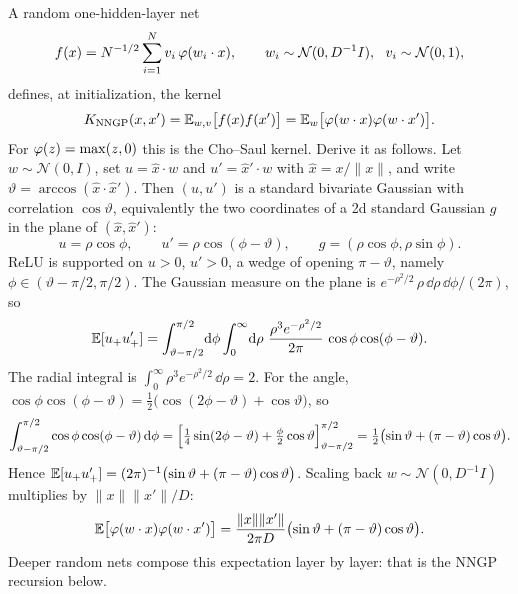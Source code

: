 A random one-hidden-layer net
\begin{equation}
  f(x)=N^{-1/2}\sum_{i=1}^{N} v_i\,\varphi(w_i\cdot x),
  \qquad w_i\sim\mathcal{N}(0,D^{-1}I),\ \ v_i\sim\mathcal{N}(0,1),
  \label{eq:shallow}
\end{equation}
defines, at initialization, the kernel
\begin{equation}
  K_{\mathrm{NNGP}}(x,x')
  =\mathbb{E}_{w,v}\bigl[f(x)f(x')\bigr]
  =\mathbb{E}_{w}\bigl[\varphi(w\cdot x)\varphi(w\cdot x')\bigr].
  \label{eq:nngp-shallow}
\end{equation}
For $\varphi(z)=\max(z,0)$ this is the Cho--Saul kernel. Derive it as follows. Let $w\sim\mathcal{N}(0,I)$, set $u=\hat x\cdot w$ and $u'=\hat x'\cdot w$ with $\hat x=x/\|x\|$, and write $\vartheta=\arccos(\hat x\cdot\hat x')$. Then $(u,u')$ is a standard bivariate Gaussian with correlation $\cos\vartheta$, equivalently the two coordinates of a 2d standard Gaussian $g$ in the plane of $(\hat x,\hat x')$:
\begin{equation}
  u=\rho\cos\phi,\qquad u'=\rho\cos(\phi-\vartheta),\qquad
  g=(\rho\cos\phi,\rho\sin\phi).
\end{equation}
ReLU is supported on $u>0$, $u'>0$, a wedge of opening $\pi-\vartheta$, namely $\phi\in(\vartheta-\pi/2,\pi/2)$. The Gaussian measure on the plane is $e^{-\rho^2/2}\,\rho\,\dd\rho\,\dd\phi/(2\pi)$, so
\begin{equation}
  \mathbb{E}[u_+u'_+]
  =\int_{\vartheta-\pi/2}^{\pi/2}\!\mathrm{d}\phi
  \int_0^\infty\!\mathrm{d}\rho\
  \frac{\rho^3 e^{-\rho^2/2}}{2\pi}\,\cos\phi\cos(\phi-\vartheta).
\end{equation}
The radial integral is $\int_0^\infty\rho^3 e^{-\rho^2/2}\,\dd\rho=2$. For the angle, $\cos\phi\cos(\phi-\vartheta)=\tfrac12\bigl(\cos(2\phi-\vartheta)+\cos\vartheta\bigr)$, so
\begin{equation}
  \int_{\vartheta-\pi/2}^{\pi/2}\cos\phi\cos(\phi-\vartheta)\,\mathrm{d}\phi
  =\Bigl[\tfrac14\sin(2\phi-\vartheta)+\tfrac\phi2\cos\vartheta\Bigr]_{\vartheta-\pi/2}^{\pi/2}
  =\tfrac12\bigl(\sin\vartheta+(\pi-\vartheta)\cos\vartheta\bigr).
\end{equation}
Hence $\mathbb{E}[u_+u'_+]=(2\pi)^{-1}\bigl(\sin\vartheta+(\pi-\vartheta)\cos\vartheta\bigr)$. Scaling back $w\sim\mathcal{N}(0,D^{-1}I)$ multiplies by $\|x\|\|x'\|/D$:
\begin{equation}
  \mathbb{E}\bigl[\varphi(w\cdot x)\varphi(w\cdot x')\bigr]
  =\frac{\|x\|\|x'\|}{2\pi D}\bigl(\sin\vartheta+(\pi-\vartheta)\cos\vartheta\bigr).
  \label{eq:cho-saul}
\end{equation}
Deeper random nets compose this expectation layer by layer: that is the NNGP recursion below.

